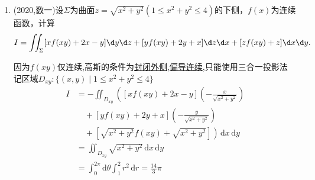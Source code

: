 \documentclass[12pt, a4paper, oneside, UTF8]{ctexbook}
\begin{document}
\begin{enumerate}[label=\arabic*.,start=8]
    \item (2020,数一)设$\Sigma$为曲面$z=\sqrt{x^2+y^2}(1\leq x^2+y^2\leq 4)$的下侧，$f(x)$为连续函数，计算
    \begin{align*}
    I=\iint_{\Sigma}[xf(xy)+2x-y]\d y\d z+[yf(xy)+2y+x]\d z\d x+[zf(xy)+z]\d x\d y.
    \end{align*}
    
    \begin{solution}
    因为$f(xy)$仅连续,高斯的条件为\underline{封闭外侧,偏导连续},只能使用三合一投影法 \\
    记区域$D_{xy}:\{(x,y)\mid 1 \leq x^2 + y^2 \leq 4\}$
    \begin{align*}
        I &= -\iint_{D_{xy}}\left(\left[xf(xy)+2x-y\right]\left(-\frac{x}{\sqrt{x^2+y^2}}\right)\right. \\
        &\quad + \left.\left[yf(xy)+2y+x\right]\left(-\frac{y}{\sqrt{x^2+y^2}}\right)\right. \\
        &\quad + \left.\left[\sqrt{x^2+y^2}f(xy)+\sqrt{x^2+y^2}\right]\right)\,\mathrm{d}x\,\mathrm{d}y \\
        &= \iint_{D_{xy}}\sqrt{x^2+y^2}\,\mathrm{d}x\,\mathrm{d}y \\
        &= \int_{0}^{2\pi}\mathrm{d}\theta\int_{1}^{2}r^2\,\mathrm{d}r = \frac{14}{3}\pi
    \end{align*}
    \end{solution}
\end{enumerate}


\ifx\allfiles\undefined
\end{document}
